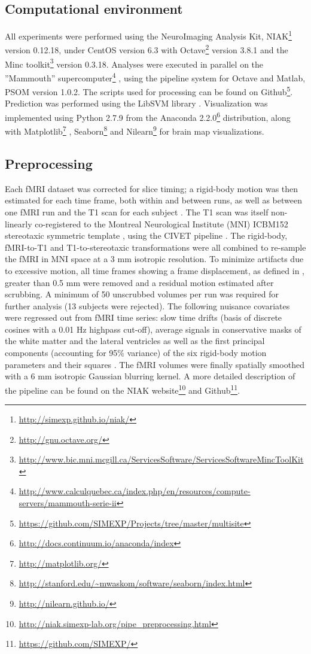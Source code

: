 \documentclass[authoryear]{elsarticle}
\begin{document}
\subsection{Computational environment}
All experiments were performed using the NeuroImaging Analysis Kit, NIAK\footnote{\url{http://simexp.github.io/niak/}} \citep{Bellec2011} version 0.12.18, under CentOS version 6.3 with Octave\footnote{\url{http://gnu.octave.org/}} version 3.8.1 and the Minc toolkit\footnote{\url{http://www.bic.mni.mcgill.ca/ServicesSoftware/ServicesSoftwareMincToolKit}} version 0.3.18. Analyses were executed in parallel on the ”Mammouth” supercomputer\footnote{\url{http://www.calculquebec.ca/index.php/en/resources/compute-servers/mammouth-serie-ii}} , using the pipeline system for Octave and Matlab, PSOM \citep{Bellec2012} version 1.0.2. The scripts used for processing can be found on Github\footnote{\url{https://github.com/SIMEXP/Projects/tree/master/multisite}}. Prediction was performed using the LibSVM library \citep{Chang2011}. Visualization was implemented using Python 2.7.9 from the Anaconda 2.2.0\footnote{\url{http://docs.continuum.io/anaconda/index}} distribution, along with Matplotlib\footnote{\url{http://matplotlib.org/}} \citep{matplotlib}, Seaborn\footnote{\url{http://stanford.edu/~mwaskom/software/seaborn/index.html}} and Nilearn\footnote{\url{http://nilearn.github.io/}} for brain map visualizations.

\subsection{Preprocessing}
Each fMRI dataset was corrected for slice timing; a rigid-body motion was then estimated for each time frame, both within and between runs, as well as between one fMRI run and the T1 scan for each subject \citep{Collins1994}. The T1 scan was itself non-linearly co-registered to the Montreal Neurological Institute (MNI) ICBM152 stereotaxic symmetric template \citep{Fonov2011}, using the CIVET pipeline \citep{Ad-Dab'bagh2006}. The rigid-body, fMRI-to-T1 and T1-to-stereotaxic transformations were all combined to re-sample the fMRI in MNI space at a 3 mm isotropic resolution. To minimize artifacts due to excessive motion, all time frames showing a frame displacement, as defined in \cite{Power2012}, greater than 0.5 mm were removed and a residual motion estimated after scrubbing. A minimum of 50 unscrubbed volumes per run was required for further analysis (13 subjects were rejected). The following nuisance covariates were regressed out from fMRI time series: slow time drifts (basis of discrete cosines with a 0.01 Hz highpass cut-off), average signals in conservative masks of the white matter and the lateral ventricles as well as the first principal components (accounting for 95\% variance) of the six rigid-body motion parameters and their squares \citep{Giove2009,Lund2006}. The fMRI volumes were finally spatially smoothed with a 6 mm isotropic Gaussian blurring kernel. A more detailed description of the pipeline can be found on the NIAK website\footnote{\url{http://niak.simexp-lab.org/pipe_preprocessing.html}} and Github\footnote{\url{https://github.com/SIMEXP/}}.
\end{document}
